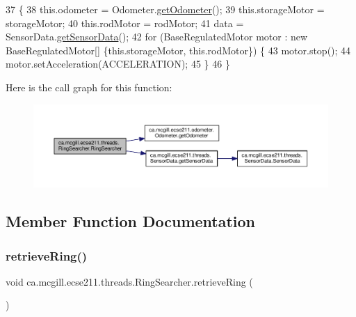 \begin{DoxyCode}
37                                 \{
38     this.odometer = Odometer.\hyperlink{classca_1_1mcgill_1_1ecse211_1_1odometer_1_1_odometer_a99171f11e34dea918fa9dd069d721439}{getOdometer}();
39     this.storageMotor = storageMotor;
40     this.rodMotor = rodMotor;
41     data = SensorData.\hyperlink{classca_1_1mcgill_1_1ecse211_1_1threads_1_1_sensor_data_a8260aba53b4474ca1275e4ce26157977}{getSensorData}();
42     \textcolor{keywordflow}{for} (BaseRegulatedMotor motor : \textcolor{keyword}{new} BaseRegulatedMotor[] \{this.storageMotor, this.rodMotor\}) \{
43       motor.stop();
44       motor.setAcceleration(ACCELERATION);
45     \}
46   \}
\end{DoxyCode}
Here is the call graph for this function\+:
\nopagebreak
\begin{figure}[H]
\begin{center}
\leavevmode
\includegraphics[width=350pt]{classca_1_1mcgill_1_1ecse211_1_1threads_1_1_ring_searcher_a58fdaba16c2b961446d1474b76e66e49_cgraph}
\end{center}
\end{figure}


\subsection{Member Function Documentation}
\mbox{\label{classca_1_1mcgill_1_1ecse211_1_1threads_1_1_ring_searcher_abd7a2651a7c5de76a018664c8bf327af}} 
\subsubsection{\texorpdfstring{retrieve\+Ring()}{retrieveRing()}}
{\footnotesize\ttfamily void ca.\+mcgill.\+ecse211.\+threads.\+Ring\+Searcher.\+retrieve\+Ring (\begin{DoxyParamCaption}{ }\end{DoxyParamCaption})}

